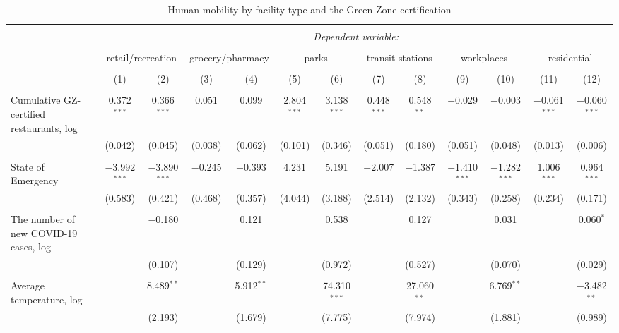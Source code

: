 
\begin{table}[!htbp] \centering 
  \caption{Human mobility by facility type and the Green Zone certification} 
  \label{} 
\footnotesize 
\begin{tabular}{@{\extracolsep{-12pt}}lcccccccccccc} 
\\[-1.8ex]\hline 
\hline \\[-1.8ex] 
 & \multicolumn{12}{c}{\textit{Dependent variable:}} \\ 
\cline{2-13} 
\\[-1.8ex] & \multicolumn{2}{c}{retail/recreation} & \multicolumn{2}{c}{grocery/pharmacy} & \multicolumn{2}{c}{parks} & \multicolumn{2}{c}{transit stations} & \multicolumn{2}{c}{workplaces} & \multicolumn{2}{c}{residential} \\ 
\\[-1.8ex] & (1) & (2) & (3) & (4) & (5) & (6) & (7) & (8) & (9) & (10) & (11) & (12)\\ 
\hline \\[-1.8ex] 
 Cumulative GZ-certified restaurants, log & 0.372$^{***}$ & 0.366$^{***}$ & 0.051 & 0.099 & 2.804$^{***}$ & 3.138$^{***}$ & 0.448$^{***}$ & 0.548$^{**}$ & $-$0.029 & $-$0.003 & $-$0.061$^{***}$ & $-$0.060$^{***}$ \\ 
  & (0.042) & (0.045) & (0.038) & (0.062) & (0.101) & (0.346) & (0.051) & (0.180) & (0.051) & (0.048) & (0.013) & (0.006) \\ 
  & & & & & & & & & & & & \\ 
 State of Emergency & $-$3.992$^{***}$ & $-$3.890$^{***}$ & $-$0.245 & $-$0.393 & 4.231 & 5.191 & $-$2.007 & $-$1.387 & $-$1.410$^{***}$ & $-$1.282$^{***}$ & 1.006$^{***}$ & 0.964$^{***}$ \\ 
  & (0.583) & (0.421) & (0.468) & (0.357) & (4.044) & (3.188) & (2.514) & (2.132) & (0.343) & (0.258) & (0.234) & (0.171) \\ 
  & & & & & & & & & & & & \\ 
 The number of new COVID-19 cases, log &  & $-$0.180 &  & 0.121 &  & 0.538 &  & 0.127 &  & 0.031 &  & 0.060$^{*}$ \\ 
  &  & (0.107) &  & (0.129) &  & (0.972) &  & (0.527) &  & (0.070) &  & (0.029) \\ 
  & & & & & & & & & & & & \\ 
 Average temperature, log &  & 8.489$^{**}$ &  & 5.912$^{**}$ &  & 74.310$^{***}$ &  & 27.060$^{**}$ &  & 6.769$^{**}$ &  & $-$3.482$^{**}$ \\ 
  &  & (2.193) &  & (1.679) &  & (7.775) &  & (7.974) &  & (1.881) &  & (0.989) \\ 

\end{tabular}
\end{table}
